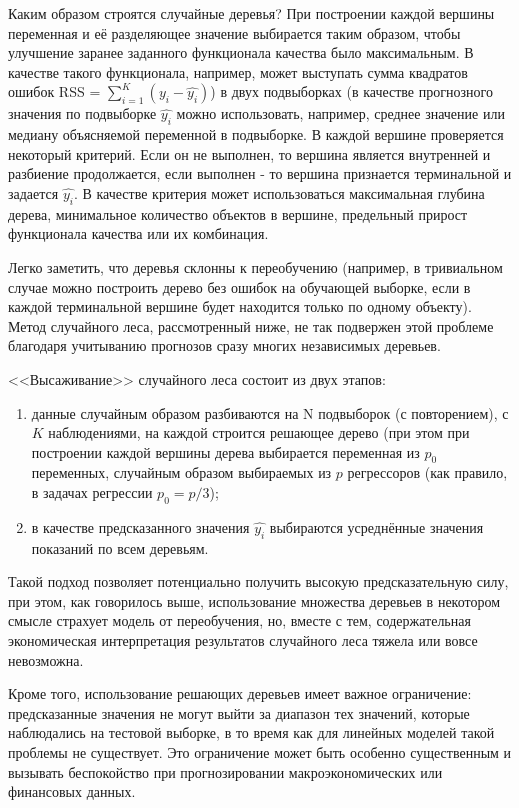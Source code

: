 Каким образом строятся случайные деревья? При построении каждой вершины переменная и её разделяющее значение выбирается таким образом, чтобы улучшение заранее заданного функционала качества было максимальным. В качестве такого функционала, например, может выступать сумма квадратов ошибок RSS = $\sum_{i=1}^{K}(y_i - \hat{y_i})$) в двух подвыборках (в качестве прогнозного значения по подвыборке $\hat{y_i}$ можно использовать, например, среднее значение или медиану объясняемой переменной в подвыборке. В каждой вершине проверяется некоторый критерий. Если он не выполнен, то вершина является внутренней и разбиение продолжается, если выполнен - то вершина признается терминальной и задается $\hat{y_i}$. В качестве критерия может использоваться максимальная глубина дерева, минимальное количество объектов в вершине, предельный прирост функционала качества или их комбинация.

Легко заметить, что деревья склонны к переобучению (например, в тривиальном случае можно построить дерево без ошибок на обучающей выборке, если в каждой терминальной вершине будет находится только по одному объекту). Метод случайного леса, рассмотренный ниже, не так подвержен этой проблеме благодаря учитыванию прогнозов сразу многих независимых деревьев.

<<Высаживание>> случайного леса состоит из двух этапов:
\begin{enumerate}
    \item данные случайным образом разбиваются на N подвыборок (с повторением), с $K$ наблюдениями, на каждой строится решающее дерево (при этом при построении каждой вершины дерева выбирается переменная из $p_0$ переменных, случайным образом выбираемых из $p$ регрессоров (как правило, в задачах регрессии $p_0 = p/3$);
    \item в качестве предсказанного значения $\hat{y_i}$ выбираются усреднённые значения показаний по всем деревьям. 
\end{enumerate}
    
Такой подход позволяет потенциально получить высокую предсказательную силу, при этом, как говорилось выше, использование множества деревьев в некотором смысле страхует модель от переобучения, но, вместе с тем, содержательная экономическая интерпретация результатов случайного леса тяжела или вовсе невозможна.

Кроме того, использование решающих деревьев имеет важное ограничение: предсказанные значения не могут выйти за диапазон тех значений, которые наблюдались на тестовой выборке, в то время как для линейных моделей такой проблемы не существует. Это ограничение может быть особенно существенным и вызывать беспокойство при прогнозировании макроэкономических или финансовых данных.

